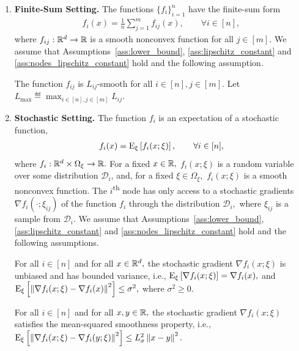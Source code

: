\documentclass{article}
\newcommand{\alexander}[1]{\todo[inline]{\textbf{Alexander: }#1}}
\begin{document}
\begin{enumerate}[leftmargin=0.75cm]
\item \textbf{Finite-Sum Setting.}
The functions $\{f_i\}_{i=1}^n$ have the finite-sum form
\begin{align}
    \label{eq:task_minibatch} f_i(x) = \frac{1}{n}\sum \limits_{j=1}^m f_{ij}(x), \qquad \forall i \in [n],
\end{align}
where $f_{ij} :\mathbb{R}^d  \rightarrow \mathbb{R}$ is a smooth nonconvex  function for all $j \in [m].$
We assume that Assumptions~\ref{ass:lower_bound}, \ref{ass:lipschitz_constant} and \ref{ass:nodes_lipschitz_constant} hold and the following assumption.
\begin{assumption}
  \label{ass:max_lipschitz_constant}
  The function $f_{ij}$ is $L_{ij}$-smooth for all $i \in [n], j \in [m].$ Let $L_{\max} \eqdef \max_{i \in [n], j \in [m]} L_{ij}.$
\end{assumption}
\item \textbf{Stochastic Setting.}
The function $f_i$ is an expectation of a stochastic function, 
\begin{align}
    \label{eq:task_staochastic}
    f_i(x) = {\rm E}_{\xi}\left[f_i(x;\xi)\right], \qquad \forall i \in [n],
\end{align}
where $f_i :\mathbb{R}^d \times \Omega_{\xi} \rightarrow \mathbb{R}.$ For a fixed $x \in \mathbb{R},$ $f_i(x;\xi)$ is a random variable over some distribution $\mathcal{D}_i$,
and, for a fixed $\xi \in \Omega_{\xi},$ $f_i(x;\xi)$ is a smooth nonconvex function.
The $i$\textsuperscript{th} node has only access to a stochastic gradients $\nabla f_i(\cdot; \xi_{ij})$ 
of the function $f_i$ through the distribution $\mathcal{D}_i,$ where $\xi_{ij}$ is a sample from $\mathcal{D}_i.$
We assume that Assumptions~\ref{ass:lower_bound}, \ref{ass:lipschitz_constant} and \ref{ass:nodes_lipschitz_constant} hold and the following assumptions.
\begin{assumption}
  \label{ass:stochastic_unbiased_and_variance_bounded}
  For all $i \in [n]$ and for all $x \in \mathbb{R}^d,$ the stochastic gradient $\nabla f_i(x;\xi)$ is unbiased and has bounded variance, i.e., ${\rm E}_{\xi}\left[\nabla f_i(x;\xi)\right] = \nabla f_i(x),$ and ${\rm E}_{\xi}\left[\left\| \nabla f_i(x;\xi) - \nabla f_i(x) \right\|^2\right] \leq \sigma^2,$ where $\sigma^2 \geq 0.$
\end{assumption}
\begin{assumption}
  \label{ass:mean_square_smoothness}
  For all $i \in [n]$ and for all $x, y \in \mathbb{R},$ the stochastic gradient $\nabla f_i(x;\xi)$ satisfies the mean-squared smoothness property, i.e., ${\rm E}_{\xi}\left[\left\| \nabla f_i(x;\xi) - \nabla f_i(y;\xi) \right\|^2\right] \leq L_{\sigma}^2 \left\| x - y \right\|^2.$
\end{assumption}


\end{enumerate}
\end{document}
